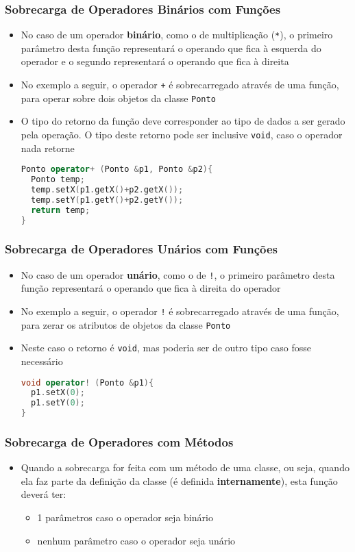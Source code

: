 \documentclass[aspectratio=169]{beamer}
\begin{document}
\begin{frame}[fragile]\frametitle{Sobrecarga de Operadores Binários com Funções}
\begin{itemize}
	\item No caso de um operador \textbf{binário}, como o de multiplicação (\texttt{*}), o primeiro parâmetro desta função representará o operando que fica à esquerda do operador e o segundo representará o operando que fica à direita
	\item No exemplo a seguir, o operador \texttt{+} é sobrecarregado através de uma função, para operar sobre dois objetos da classe \texttt{Ponto}
	\item O tipo do retorno da função deve corresponder ao tipo de dados a ser gerado pela operação. O tipo deste retorno pode ser inclusive \texttt{void}, caso o operador nada retorne
\begin{lstlisting}[language=C++,basicstyle=\ttfamily\small]
Ponto operator+ (Ponto &p1, Ponto &p2){
  Ponto temp;
  temp.setX(p1.getX()+p2.getX());
  temp.setY(p1.getY()+p2.getY());
  return temp;
}
\end{lstlisting}
\end{itemize}
\end{frame}

\begin{frame}[fragile]\frametitle{Sobrecarga de Operadores Unários com Funções}
\begin{itemize}
	\item No caso de um operador \textbf{unário}, como o de \texttt{!}, o primeiro parâmetro desta função representará o operando que fica à direita do operador
	\item No exemplo a seguir, o operador \texttt{!} é sobrecarregado através de uma função, para zerar os atributos de objetos da classe \texttt{Ponto}
	\item Neste caso o retorno é \texttt{void}, mas poderia ser de outro tipo caso fosse necessário
\begin{lstlisting}[language=C++,basicstyle=\ttfamily\small]
void operator! (Ponto &p1){
  p1.setX(0);
  p1.setY(0);
}
\end{lstlisting}
\end{itemize}
\end{frame}

\begin{frame}\frametitle{Sobrecarga de Operadores com Métodos}
\begin{itemize}
	\item Quando a sobrecarga for feita com um método de uma classe, ou seja, quando ela faz parte da definição da classe (é definida \textbf{internamente}), esta função deverá ter:
	\begin{itemize}
		\item 1 parâmetros caso o operador seja binário
		\item nenhum parâmetro caso o operador seja unário
	\end{itemize}
\end{itemize}
\end{frame}
\end{document}
